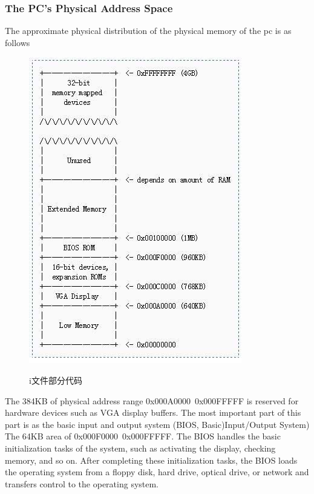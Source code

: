 \subsubsection{The PC's Physical Address Space}
The approximate physical distribution of the physical memory of the pc is as follows
\begin{figure}[H]
  \centering
  \includegraphics[width=0.8\linewidth]{figure/physical_address}\\
  \caption{i文件部分代码}\label{2}
\end{figure}
The 384KB of physical address range 0x000A0000~0x000FFFFF is reserved for hardware devices such as VGA display buffers. The most important part of this part is as the basic input and output system (BIOS, Basic)Input/Output System) The 64KB area of ​​0x000F0000~0x000FFFFF. The BIOS handles the basic initialization tasks of the system, such as activating the display, checking memory, and so on. After completing these initialization tasks, the BIOS loads the operating system from a floppy disk, hard drive, optical drive, or network and transfers control to the operating system.

